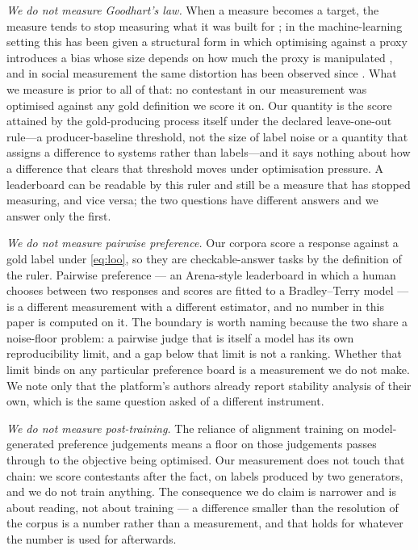 \documentclass{article}
\begin{document}
\emph{We do not measure Goodhart's law.} When a measure becomes a target, the measure tends to stop measuring what it was built for \cite{goodhart1984}; in the machine-learning setting this has been given a structural form in which optimising against a proxy introduces a bias whose size depends on how much the proxy is manipulated \cite{hennessygoodhart2023}, and in social measurement the same distortion has been observed since \cite{campbell2011}. What we measure is prior to all of that: no contestant in our measurement was optimised against any gold definition we score it on. Our quantity is the score attained by the gold-producing process itself under the declared leave-one-out rule---a producer-baseline threshold, not the size of label noise or a quantity that assigns a difference to systems rather than labels---and it says nothing about how a difference that clears that threshold moves under optimisation pressure. A leaderboard can be readable by this ruler and still be a measure that has stopped measuring, and vice versa; the two questions have different answers and we answer only the first.

\emph{We do not measure pairwise preference.} Our corpora score a response against a gold label under \eqref{eq:loo}, so they are checkable-answer tasks by the definition of the ruler. Pairwise preference --- an Arena-style leaderboard in which a human chooses between two responses and scores are fitted to a Bradley--Terry model \cite{chiang2024chatbotarena,bradleyterry1952} --- is a different measurement with a different estimator, and no number in this paper is computed on it. The boundary is worth naming because the two share a noise-floor problem: a pairwise judge that is itself a model has its own reproducibility limit, and a gap below that limit is not a ranking. Whether that limit binds on any particular preference board is a measurement we do not make. We note only that the platform's authors already report stability analysis of their own, which is the same question asked of a different instrument.

\emph{We do not measure post-training.} The reliance of alignment training on model-generated preference judgements \cite{ouyang2022rlhf,rafailov2023dpo} means a floor on those judgements passes through to the objective being optimised. Our measurement does not touch that chain: we score contestants after the fact, on labels produced by two generators, and we do not train anything. The consequence we do claim is narrower and is about reading, not about training --- a difference smaller than the resolution of the corpus is a number rather than a measurement, and that holds for whatever the number is used for afterwards.
\end{document}
